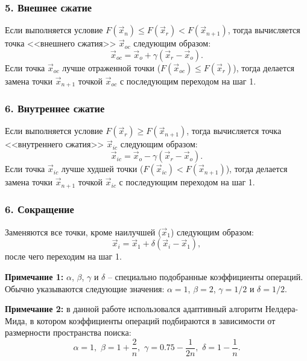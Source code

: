 \subsubsection{5. Внешнее сжатие}
\noindent\indent Если выполняется условие $F(\vec{x}_n) \leq F(\vec{x}_r) < F(\vec{x}_{n+1})$,
тогда вычисляется точка <<внешнего сжатия>> $\vec{x}_{oc}$ следующим образом:
\begin{equation}
  \vec{x}_{oc} = \vec{x}_o + \gamma(\vec{x}_{r} - \vec{x}_o).
\end{equation}
Если точка $\vec{x}_{oc}$ лучше отраженной точки ($F(\vec{x}_{oc}) \leq F(\vec{x}_{r})$),
тогда делается замена точки $\vec{x}_{n+1}$ точкой $\vec{x}_{oc}$ с последующим
переходом на шаг 1.
\subsubsection{6. Внутреннее сжатие}
\noindent\indent Если выполняется условие $F(\vec{x}_r) \geq F(\vec{x}_{n+1})$,
тогда вычисляется точка <<внутреннего сжатия>> $\vec{x}_{ic}$ следующим образом:
\begin{equation}
  \vec{x}_{ic} = \vec{x}_o - \gamma(\vec{x}_{r} - \vec{x}_o).
\end{equation}
Если точка $\vec{x}_{ic}$ лучше худшей точки ($F(\vec{x}_{ic}) < F(\vec{x}_{n+1})$),
тогда делается замена точки $\vec{x}_{n+1}$ точкой $\vec{x}_{ic}$ с последующим
переходом на шаг 1.
\subsubsection{6. Сокращение}
\noindent\indent Заменяются все точки, кроме наилучшей ($\vec{x}_1$) следующим образом:
\begin{equation}
  \vec{x}_i = \vec{x}_1 + \delta(\vec{x}_i - \vec{x}_1),
\end{equation}
после чего переходим на шаг 1.\par
  \textbf{Примечание 1:} $\alpha$, $\beta$, $\gamma$ и $\delta$ -- специально подобранные
коэффициенты операций. Обычно указываются следующие значения:
$\alpha = 1$, $\beta = 2$, $\gamma = 1/2$ и $\delta = 1/2$.\par
    \textbf{Примечание 2:} в данной работе использовался адаптивный алгоритм
Нелдера-Мида, в котором коэффициенты операций подбираются в зависимости от
размерности пространства поиска:
\begin{equation}
    \alpha = 1,\,\, \beta = 1 + \frac{2}{n},\,\,
    \gamma = 0.75 - \frac{1}{2n},\,\, \delta = 1 - \frac{1}{n}.
\end{equation}
